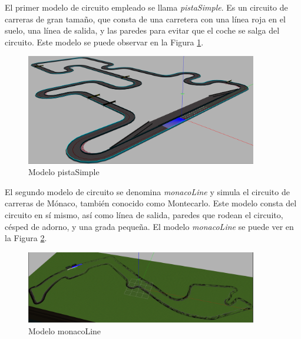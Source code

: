 El primer modelo de circuito empleado se llama \textit{pistaSimple}. Es un circuito de carreras de gran tamaño, que consta de una carretera con una línea roja en el suelo, una línea de salida, y las paredes para evitar que el coche se salga del circuito. Este modelo se puede observar en la Figura \ref{fig.simple}.\\

\begin{figure}
  \begin{center}
    \includegraphics[width=0.9\textwidth]{figures/Infraestructura/circuit_Simple.png}
		\caption{Modelo pistaSimple}
		\label{fig.simple}
		\end{center}
\end{figure}

El segundo modelo de circuito se denomina \textit{monacoLine} y simula el circuito de carreras de Mónaco, también conocido como Montecarlo. Este modelo consta del circuito en sí mismo, así como línea de salida, paredes que rodean el circuito, césped de adorno, y una grada pequeña. El modelo \textit{monacoLine} se puede ver en la Figura \ref{fig.monaco}.\\


\begin{figure}
  \begin{center}
    \includegraphics[width=0.9\textwidth]{figures/Infraestructura/circuit_Monaco.png}
		\caption{Modelo monacoLine}
		\label{fig.monaco}
		\end{center}
\end{figure}

